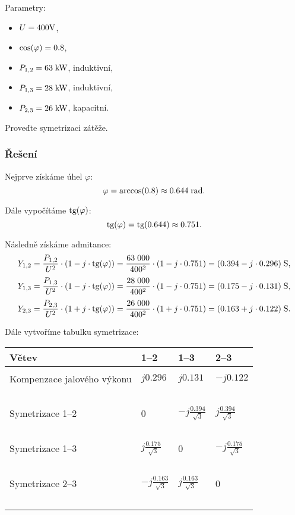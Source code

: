 \documentclass{article}
\begin{document}
Parametry:
\begin{itemize}
    \item $U = 400 \textrm{V}$,
    \item $\textrm{cos} (\varphi) = 0.8$,
    \item $P_{1,2} = 63 \; \textrm{kW}$, induktivní,
    \item $P_{1,3} = 28 \; \textrm{kW}$, induktivní,
    \item $P_{2,3} = 26 \; \textrm{kW}$, kapacitní.
\end{itemize}

Proveďte symetrizaci zátěže.

\subsubsection{Řešení}
Nejprve získáme úhel $\varphi$:
$$
    \varphi = \textrm{arccos} (0.8) \approx 0.644 \; \textrm{rad}.
$$

Dále vypočítáme $\textrm{tg} (\varphi)$:
$$
    \textrm{tg} (\varphi) = \textrm{tg} (0.644) \approx 0.751.
$$

Následně získáme admitance:
$$
    Y_{1,2} = \frac{P_{1,2}}{U^2} \cdot (1 - j \cdot \textrm{tg} (\varphi)) = \frac{63 \; 000}{400^2} \cdot (1 - j \cdot 0.751) = (0.394 - j \cdot 0.296) \; \textrm{S},
$$
$$
    Y_{1,3} = \frac{P_{1,3}}{U^2} \cdot (1 - j \cdot \textrm{tg} (\varphi)) = \frac{28 \; 000}{400^2} \cdot (1 - j \cdot 0.751) = (0.175 - j \cdot 0.131) \; \textrm{S},
$$
$$
    Y_{2,3} = \frac{P_{2,3}}{U^2} \cdot (1 + j \cdot \textrm{tg} (\varphi)) = \frac{26 \; 000}{400^2} \cdot (1 + j \cdot 0.751) = (0.163 + j \cdot 0.122) \; \textrm{S}.
$$

Dále vytvoříme tabulku symetrizace:
\begin{table}[H]
    \centering
    \begin{tabular}{l l l l}
        \hline
        Větev                      & 1--2                        & 1--3                        & 2--3                        \\
        \hline                                                                                                               \\
        Kompenzace jalového výkonu & $j 0.296$                   & $j 0.131$                   & $-j 0.122$                  \\~\\
        Symetrizace 1--2           & 0                           & $-j \frac{0.394}{\sqrt{3}}$ & $j \frac{0.394}{\sqrt{3}}$  \\~\\
        Symetrizace 1--3           & $j \frac{0.175}{\sqrt{3}}$  & 0                           & $-j \frac{0.175}{\sqrt{3}}$ \\~\\
        Symetrizace 2--3           & $-j \frac{0.163}{\sqrt{3}}$ & $j \frac{0.163}{\sqrt{3}}$  & 0                           \\~\\
        \hline
    \end{tabular}
\end{table}
\end{document}
